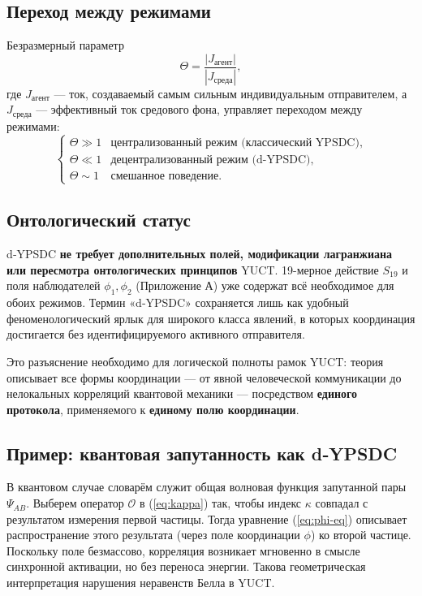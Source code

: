 \documentclass[11pt,a4paper]{article}
\begin{document}
	\subsection{Переход между режимами}
	Безразмерный параметр
	\[
	\Theta = \frac{|J_{\mathrm{агент}}|}{|J_{\mathrm{среда}}|},
	\]
	где \(J_{\mathrm{агент}}\) — ток, создаваемый самым сильным индивидуальным отправителем, а \(J_{\mathrm{среда}}\) — эффективный ток средового фона, управляет переходом между режимами:
	\[
	\begin{cases}
		\Theta \gg 1 & \text{централизованный режим (классический YPSDC)}, \\
		\Theta \ll 1 & \text{децентрализованный режим (d‑YPSDC)}, \\
		\Theta \sim 1 & \text{смешанное поведение}.
	\end{cases}
	\]
	
	\subsection{Онтологический статус}
	d‑YPSDC \textbf{не требует дополнительных полей, модификации лагранжиана или пересмотра онтологических принципов} YUCT. 19-мерное действие \(S_{19}\) и поля наблюдателей \(\phi_1,\phi_2\) (Приложение А) уже содержат всё необходимое для обоих режимов. Термин «d‑YPSDC» сохраняется лишь как удобный феноменологический ярлык для широкого класса явлений, в которых координация достигается без идентифицируемого активного отправителя.
	
	Это разъяснение необходимо для логической полноты рамок YUCT: теория описывает все формы координации — от явной человеческой коммуникации до нелокальных корреляций квантовой механики — посредством \textbf{единого протокола}, применяемого к \textbf{единому полю координации}.
	
	\subsection{Пример: квантовая запутанность как d‑YPSDC}
	
	В квантовом случае словарём служит общая волновая функция запутанной пары \(\Psi_{AB}\). Выберем оператор \(\mathcal{O}\) в (\ref{eq:kappa}) так, чтобы индекс \(\kappa\) совпадал с результатом измерения первой частицы. Тогда уравнение (\ref{eq:phi-eq}) описывает распространение этого результата (через поле координации \(\phi\)) ко второй частице. Поскольку поле безмассово, корреляция возникает мгновенно в смысле синхронной активации, но без переноса энергии. Такова геометрическая интерпретация нарушения неравенств Белла в YUCT.
	
\end{document}
